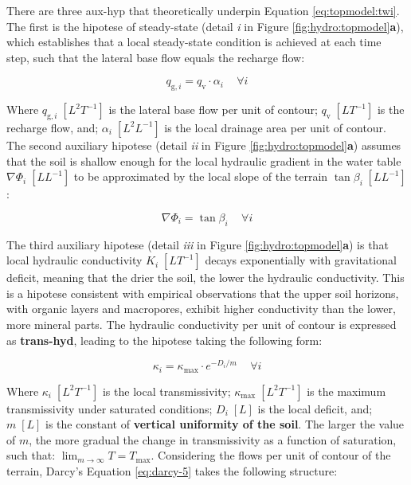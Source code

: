 \documentclass[./main_en.tex]{subfiles}
\begin{document}
\par There are three \gls{aux-hyp} that theoretically underpin Equation \eqref{eq:topmodel:twi}. The first is the \gls{hipotese} of steady-state (detail \textit{i} in Figure \ref{fig:hydro:topmodel}\textbf{a}), which establishes that a local steady-state condition is achieved at each time step, such that the lateral base flow equals the recharge flow:
\begin{linenomath*}
\begin{equation}
\label{eq:topmodel:prem1}
q_{\text{g}, i} = q_{\text{v}} \cdot \alpha_{i}  \quad \, \forall i
\end{equation}
\end{linenomath*}
Where $q_{\text{g}, i}\; [L^{2}T^{-1}]$ is the lateral base flow per unit of contour; $q_{\text{v}}\; [LT^{-1}]$ is the recharge flow, and; $\alpha_{i}\; [L^{2}L^{-1}]$ is the local drainage area per unit of contour. The second auxiliary \gls{hipotese} (detail \textit{ii} in Figure \ref{fig:hydro:topmodel}\textbf{a}) assumes that the soil is shallow enough for the local hydraulic gradient in the water table $\nabla \Phi_{i}\; [LL^{-1}]$ to be approximated by the local slope of the terrain $\tan \beta_{i}\; [LL^{-1}]$:
\begin{linenomath*}
\begin{equation}
\label{eq:topmodel:prem2}
\nabla \Phi_{i} = \tan \beta_{i} \quad \, \forall i
\end{equation}
\end{linenomath*}
The third auxiliary \gls{hipotese} (detail \textit{iii} in Figure \ref{fig:hydro:topmodel}\textbf{a}) is that local hydraulic conductivity $K_{ i}\; [LT^{-1}]$ decays exponentially with gravitational deficit, meaning that the drier the soil, the lower the hydraulic conductivity. This is a \gls{hipotese} consistent with empirical observations that the upper soil horizons, with organic layers and macropores, exhibit higher conductivity than the lower, more mineral parts. The hydraulic conductivity per unit of contour is expressed as \textbf{\gls{trans-hyd}}, leading to the \gls{hipotese} taking the following form:
\begin{linenomath*}
\begin{equation}
\label{eq:topmodel:prem3}
\kappa_{i} = \kappa_{\text{max}} \cdot e^{-D_{i}/m}  \quad \, \forall i
\end{equation}
\end{linenomath*}
Where $\kappa_{i}\; [L^{2}T^{-1}]$ is the local transmissivity; $\kappa_{\text{max}}\; [L^{2}T^{-1}]$ is the maximum transmissivity under saturated conditions; $D_{i}\; [L]$ is the local deficit, and; $m\; [L]$ is the constant of \textbf{vertical uniformity of the soil}. The larger the value of $m$, the more gradual the change in transmissivity as a function of saturation, such that: $\lim_{m\to\infty} T = T_{\text{max}}$. Considering the flows per unit of contour of the terrain, Darcy's Equation \eqref{eq:darcy-5} takes the following structure:
\end{document}
